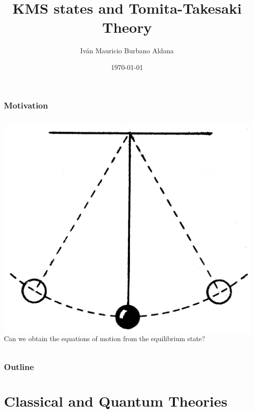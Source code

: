 \documentclass{beamer}
\title{KMS states and Tomita-Takesaki Theory\nocite{Burbano2017}}
\author[Iván Burbano]{Iván Mauricio Burbano Aldana}
\institute{Universidad de los Andes}
\date{\today}
\begin{document}
\begin{frame}
	\titlepage
\end{frame}

\begin{frame}
	\frametitle{Motivation}
	\begin{columns}
		\includegraphics[width=\textwidth]{images/pendulum.png}
		Can we obtain the equations of motion from the equilibrium state?
		\vspace{1cm}
		
	\end{columns}
\end{frame}

\begin{frame}
	\frametitle{Outline}
	\tableofcontents
\end{frame}

\section{Classical and Quantum Theories}
\end{document}
